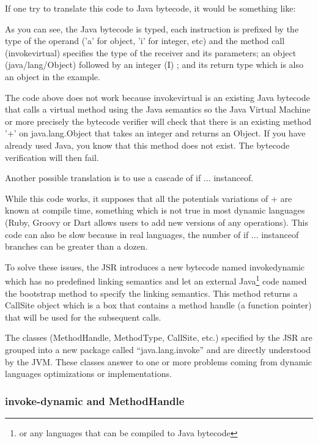 \documentclass{sig-alternate}
\def \Jsr{JSR\xspace}
\def \JVM{JVM\xspace}
\begin{document}
      If one try to translate this code to Java bytecode, it would be something like:

      

      As you can see, the Java bytecode is typed, each instruction is prefixed 
      by the type of the operand ('a' for object, 'i' for integer, etc)
      and the method call (invokevirtual) specifies the type of the receiver and its parameters;
      an object (java/lang/Object) followed by an integer (I) ; and its return type
      which is also an object in the example.

      The code above does not work because invokevirtual is an existing Java bytecode that calls
      a virtual method using the Java semantics so the Java Virtual Machine or more precisely
      the bytecode verifier will check that there is an existing method '+' on java.lang.Object
      that takes an integer and returns an Object. If you have already used Java, you know
      that this method does not exist. The bytecode verification will then fail.

      Another possible translation is to use a cascade of if ... instanceof.

      

      While this code works, it supposes that all the potentials variations of + are known at compile time,
      something which is not true in most dynamic languages (Ruby, Groovy or Dart allows users to add
      new versions of any operations).
      This code can also be slow because in real languages, the number of if ... instanceof branches
      can be greater than a dozen. 

      To solve these issues, the \Jsr introduces a new bytecode named invokedynamic which has no predefined
      linking semantics and let an external Java\footnote{or any languages that can be compiled to Java bytecode} code
      named the bootstrap method to specify the linking semantics.
      This method returns a CallSite object which is a box that contains a method handle (a function pointer)
      that will be used for the subsequent calls.

      The classes (MethodHandle, MethodType, CallSite, etc.) specified by the \Jsr are grouped into a new
      package called ``java.lang.invoke'' and are directly understood by the \JVM.
      These classes answer to one or more problems coming from dynamic languages optimizations or implementations.

    \subsubsection{invoke-dynamic and MethodHandle}
\end{document}
